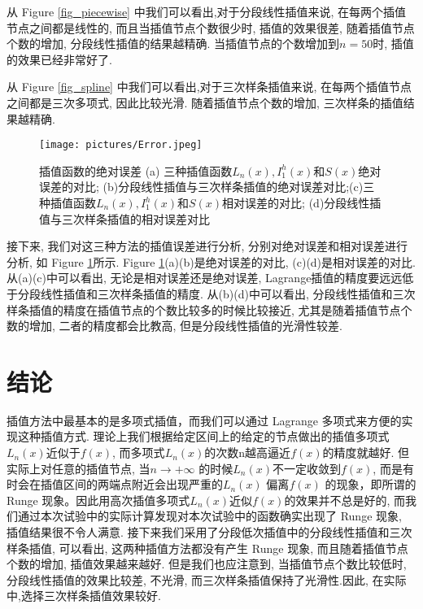 \documentclass[a4paper]{article}
\begin{document}
\begin{spacing}{1.5}
\begin{CJK*}{GBK}{song}
从 Figure \ref{fig_piecewise} 中我们可以看出,对于分段线性插值来说, 在每两个插值节点之间都是线性的, 而且当插值节点个数很少时, 插值的效果很差, 随着插值节点个数的增加, 分段线性插值的结果越精确. 当插值节点的个数增加到$n=50$时, 插值的效果已经非常好了.\par
从 Figure \ref{fig_spline} 中我们可以看出,对于三次样条插值来说, 在每两个插值节点之间都是三次多项式, 因此比较光滑. 随着插值节点个数的增加, 三次样条的插值结果越精确.\par
\begin{figure}[!htbp]
\centering\texttt{[image: pictures/Error.jpeg]}
\setlength{\abovecaptionskip}{0pt}
\caption{\small{插值函数的绝对误差 (a) 三种插值函数$L_n(x), I_1^h(x)$和$S(x)$绝对误差的对比; (b)分段线性插值与三次样条插值的绝对误差对比;(c)三种插值函数$L_n(x), I_1^h(x)$和$S(x)$相对误差的对比; (d)分段线性插值与三次样条插值的相对误差对比}}\label{fig_err}
\setlength{\belowcaptionskip}{0pt}
\end{figure}

接下来, 我们对这三种方法的插值误差进行分析, 分别对绝对误差和相对误差进行分析, 如 Figure \ref{fig_err}所示. Figure \ref{fig_err}(a)(b)是绝对误差的对比, (c)(d)是相对误差的对比. 从(a)(c)中可以看出, 无论是相对误差还是绝对误差, Lagrange插值的精度要远远低于分段线性插值和三次样条插值的精度. 从(b)(d)中可以看出, 分段线性插值和三次样条插值的精度在插值节点的个数比较多的时候比较接近, 尤其是随着插值节点个数的增加, 二者的精度都会比教高, 但是分段线性插值的光滑性较差.

\section{结论}
插值方法中最基本的是多项式插值，而我们可以通过 Lagrange 多项式来方便的实现这种插值方式. 理论上我们根据给定区间上的给定的节点做出的插值多项式$L_n(x)$近似于$f(x)$, 而多项式$L_n(x)$的次数n越高逼近$f(x)$的精度就越好. 但实际上对任意的插值节点, 当$n\rightarrow +\infty$ 的时候$L_n(x)$不一定收敛到$f(x)$, 而是有时会在插值区间的两端点附近会出现严重的$L_n(x)$ 偏离$f(x)$ 的现象，即所谓的 Runge 现象。因此用高次插值多项式$L_n(x)$近似$f(x)$的效果并不总是好的, 而我们通过本次试验中的实际计算发现对本次试验中的函数确实出现了 Runge 现象, 插值结果很不令人满意. 接下来我们采用了分段低次插值中的分段线性插值和三次样条插值, 可以看出, 这两种插值方法都没有产生 Runge 现象, 而且随着插值节点个数的增加, 插值效果越来越好. 但是我们也应注意到, 当插值节点个数比较低时, 分段线性插值的效果比较差, 不光滑, 而三次样条插值保持了光滑性.因此, 在实际中,选择三次样条插值效果较好.

\end{CJK*}
\end{spacing}
\end{document}
